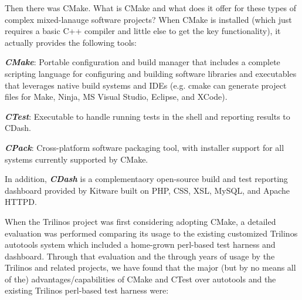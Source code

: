 \documentclass[10pt]{article}
\begin{document}
Then there was CMake.  What is CMake and what does it offer for these types of complex mixed-lanauge software projects?  When CMake is installed (which just requires a basic C++ compiler and little else to get the key functionality), it actually provides the following tools:

\begin{compactitem}
\item\textit{\textbf{CMake}}: Portable configuration and build manager that includes a complete scripting language for configuring and building software libraries and executables that leverages native build systems and IDEs (e.g. cmake can generate project files for Make, Ninja, MS Visual Studio, Eclipse, and XCode).
\item\textit{\textbf{CTest}}: Executable to handle running tests in the shell and reporting results to CDash.
\item\textit{\textbf{CPack}}: Cross-platform software packaging tool, with installer support for all systems currently supported by CMake.
\end{compactitem}

In addition, \textit{\textbf{CDash}} is a complementaory open-source build and test reporting dashboard provided by Kitware built on PHP, CSS, XSL, MySQL, and Apache HTTPD.

When the Trilinos project was first considering adopting CMake, a detailed evaluation was performed \cite{TrilinosCMakeEvaluation08} comparing its usage to the existing customized Trilinos autotools system which included a home-grown perl-based test harness and dashboard.  Through that evaluation and the through years of usage by the Trilinos and related projects, we have found that the major (but by no means all of the) advantages/capabilities of CMake and CTest over autotools and the existing Trilinos perl-based test harness were:
\end{document}
